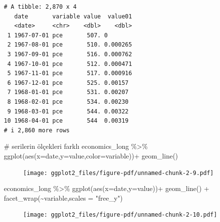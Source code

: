 \documentclass[
  letterpaper,
  DIV=11,
  numbers=noendperiod]{scrreprt}
\newenvironment{Shaded}{\begin{snugshade}}{\end{snugshade}}
\newcommand{\AttributeTok}[1]{\textcolor[rgb]{0.40,0.45,0.13}{#1}}
\newcommand{\CommentTok}[1]{\textcolor[rgb]{0.37,0.37,0.37}{#1}}
\newcommand{\FunctionTok}[1]{\textcolor[rgb]{0.28,0.35,0.67}{#1}}
\newcommand{\NormalTok}[1]{\textcolor[rgb]{0.00,0.23,0.31}{#1}}
\newcommand{\SpecialCharTok}[1]{\textcolor[rgb]{0.37,0.37,0.37}{#1}}
\newcommand{\StringTok}[1]{\textcolor[rgb]{0.13,0.47,0.30}{#1}}
\begin{document}
\begin{verbatim}
# A tibble: 2,870 x 4
   date       variable value  value01
   <date>     <chr>    <dbl>    <dbl>
 1 1967-07-01 pce       507. 0       
 2 1967-08-01 pce       510. 0.000265
 3 1967-09-01 pce       516. 0.000762
 4 1967-10-01 pce       512. 0.000471
 5 1967-11-01 pce       517. 0.000916
 6 1967-12-01 pce       525. 0.00157 
 7 1968-01-01 pce       531. 0.00207 
 8 1968-02-01 pce       534. 0.00230 
 9 1968-03-01 pce       544. 0.00322 
10 1968-04-01 pce       544  0.00319 
# i 2,860 more rows
\end{verbatim}

\begin{Shaded}
\begin{Highlighting}[]
\CommentTok{\# serilerin ölçekleri farklı }
\NormalTok{economics\_long }\SpecialCharTok{\%\textgreater{}\%} 
  \FunctionTok{ggplot}\NormalTok{(}\FunctionTok{aes}\NormalTok{(}\AttributeTok{x=}\NormalTok{date,}\AttributeTok{y=}\NormalTok{value,}\AttributeTok{color=}\NormalTok{variable))}\SpecialCharTok{+}
  \FunctionTok{geom\_line}\NormalTok{()}
\end{Highlighting}
\end{Shaded}

\begin{figure}[H]

{\centering \texttt{[image: ggplot2\_files/figure-pdf/unnamed-chunk-2-9.pdf]}

}

\end{figure}

\begin{Shaded}
\begin{Highlighting}[]
\NormalTok{economics\_long }\SpecialCharTok{\%\textgreater{}\%} 
  \FunctionTok{ggplot}\NormalTok{(}\FunctionTok{aes}\NormalTok{(}\AttributeTok{x=}\NormalTok{date,}\AttributeTok{y=}\NormalTok{value))}\SpecialCharTok{+}
  \FunctionTok{geom\_line}\NormalTok{() }\SpecialCharTok{+}
  \FunctionTok{facet\_wrap}\NormalTok{(}\SpecialCharTok{\textasciitilde{}}\NormalTok{variable,}\AttributeTok{scales =} \StringTok{"free\_y"}\NormalTok{)}
\end{Highlighting}
\end{Shaded}

\begin{figure}[H]

{\centering \texttt{[image: ggplot2\_files/figure-pdf/unnamed-chunk-2-10.pdf]}

}

\end{figure}
\end{document}
